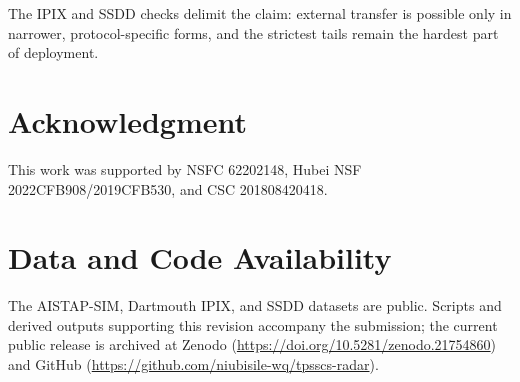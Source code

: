 \documentclass[journal]{IEEEtran}
\begin{document}
The IPIX and SSDD checks delimit the claim: external transfer is possible only in narrower, protocol-specific forms, and the strictest tails remain the hardest part of deployment.

\section*{Acknowledgment}

This work was supported by NSFC 62202148, Hubei NSF 2022CFB908/2019CFB530, and CSC 201808420418.

\section*{Data and Code Availability}

The AISTAP-SIM, Dartmouth IPIX, and SSDD datasets are public. Scripts and derived outputs supporting this revision accompany the submission; the current public release is archived at Zenodo (\url{https://doi.org/10.5281/zenodo.21754860}) and GitHub (\url{https://github.com/niubisile-wq/tpsscs-radar}).
\begingroup
\fontsize{7.0}{7.6}\selectfont
\end{document}
